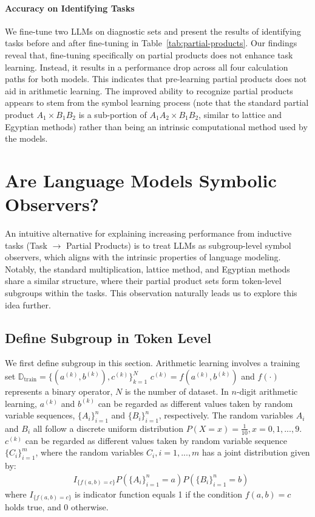 \documentclass[11pt]{article}
\begin{document}
\paragraph{Accuracy on Identifying Tasks}
We fine-tune two LLMs on diagnostic sets and present the results of identifying tasks before and after fine-tuning in Table~\ref{tab:partial-products}. Our findings reveal that,
fine-tuning specifically on partial products does not enhance task learning. Instead, it results in a performance drop across all four calculation paths for both models. This indicates that pre-learning partial products does not aid in arithmetic learning. The improved ability to recognize partial products appears to stem from the symbol learning process (note that the standard partial product $A_1 \times B_1B_2$ is a sub-portion of $A_1A_2 \times B_1B_2$, similar to lattice and Egyptian methods) rather than being an intrinsic computational method used by the models.

\section{Are Language Models Symbolic Observers?}
An intuitive alternative for explaining increasing performance from inductive tasks (Task $\rightarrow$ Partial Products) is to treat LLMs as subgroup-level symbol observers, which aligns with the intrinsic properties of language modeling. Notably, the standard multiplication, lattice method, and Egyptian methods share a similar structure, where their partial product sets form token-level subgroups within the tasks. This observation naturally leads us to explore this idea further.
\subsection{Define Subgroup in Token Level}
\label{sec:subgroup_def}
We first define subgroup in this section. Arithmetic learning involves a training set $\mathbb{D}_{\text{train}}=\{(a^{(k)}, b^{(k)}), c^{(k)} \}_{k=1}^{N}$  $c^{(k)} = f(a^{(k)}, b^{(k)})$ and $f(\cdot)$ represents a binary operator, $N$ is the number of dataset. In \( n \)-digit arithmetic learning, \( a^{(k)} \) and \( b^{(k)} \) can be regarded as different values taken by random variable sequences, \( \{A_i\}_{i=1}^n \) and \( \{B_i\}_{i=1}^n \), respectively. The random variables \( A_i\) and \(B_i\) all follow a discrete uniform distribution \( P(X = x) = \frac{1}{10}, x = 0,1,...,9 \).  \( c^{(k)} \) can be regarded as different values taken by random variable sequence \( \{C_i\}_{i=1}^{m} \), where the random variables  \( C_i, i=1,...,m\) has a joint distribution given by: 
\begin{align*}
&I_{\{f(a,b) = c\}} P(\{A_i\}_{i=1}^n = a) P(\{B_i\}_{i=1}^n = b)    
\end{align*}
where $I_{\{f(a,b) = c\}}$ is indicator function equals 1 if the condition $f(a,b) = c$ holds true, and 0 otherwise. 
\end{document}
